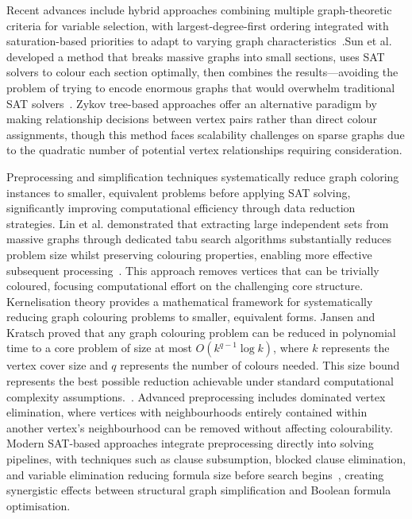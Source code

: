 Recent advances include hybrid approaches combining multiple graph-theoretic criteria for variable selection, with largest-degree-first ordering integrated with saturation-based priorities to adapt to varying graph characteristics~\cite{catalyurek2012ordering}.Sun et al. developed a method that breaks massive graphs into small sections, uses SAT solvers to colour each section optimally, then combines the results—avoiding the problem of trying to encode enormous graphs that would overwhelm traditional SAT solvers~\cite{sun2023sat}. Zykov tree-based approaches offer an alternative paradigm by making relationship decisions between vertex pairs rather than direct colour assignments, though this method faces scalability challenges on sparse graphs due to the quadratic number of potential vertex relationships requiring consideration.

Preprocessing and simplification techniques systematically reduce graph coloring instances to smaller, equivalent problems before applying SAT solving, significantly improving computational efficiency through data reduction strategies. Lin et al. demonstrated that extracting large independent sets from massive graphs through dedicated tabu search algorithms substantially reduces problem size whilst preserving colouring properties, enabling more effective subsequent processing~\cite{lin2012coloring}. This approach removes vertices that can be trivially coloured, focusing computational effort on the challenging core structure.
Kernelisation theory provides a mathematical framework for systematically reducing graph colouring problems to smaller, equivalent forms. Jansen and Kratsch proved that any graph colouring problem can be reduced in polynomial time to a core problem of size at most $O(k^{q-1}\log k)$, where $k$ represents the vertex cover size and $q$ represents the number of colours needed. This size bound represents the best possible reduction achievable under standard computational complexity assumptions.~\cite{jansen2013data}. Advanced preprocessing includes dominated vertex elimination, where vertices with neighbourhoods entirely contained within another vertex's neighbourhood can be removed without affecting colourability. Modern SAT-based approaches integrate preprocessing directly into solving pipelines, with techniques such as clause subsumption, blocked clause elimination, and variable elimination reducing formula size before search begins~\cite{cao2021hash}, creating synergistic effects between structural graph simplification and Boolean formula optimisation.

